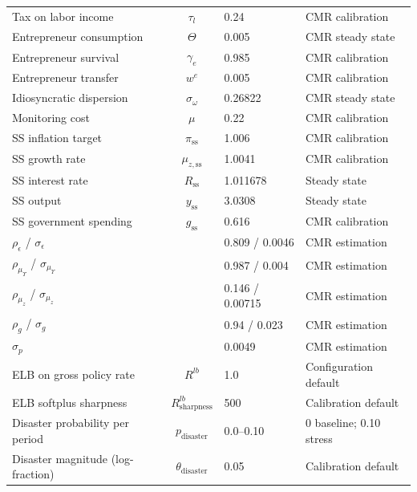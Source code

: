 \documentclass[11pt]{article}
\begin{document}
\begin{table}[h!]
\begin{tabular}{lcll}
Tax on labor income & $\tau_l$ & 0.24 & CMR calibration \\[3pt]
Entrepreneur consumption & $\Theta$ & 0.005 & CMR steady state \\
Entrepreneur survival & $\gamma_e$ & 0.985 & CMR calibration \\
Entrepreneur transfer & $w^e$ & 0.005 & CMR calibration \\
Idiosyncratic dispersion & $\sigma_\omega$ & 0.26822 & CMR steady state \\
Monitoring cost & $\mu$ & 0.22 & CMR calibration \\[3pt]
SS inflation target & $\pi_{\text{ss}}$ & 1.006 & CMR calibration \\
SS growth rate & $\mu_{z,\text{ss}}$ & 1.0041 & CMR calibration \\
SS interest rate & $R_{\text{ss}}$ & 1.011678 & Steady state \\
SS output & $y_{\text{ss}}$ & 3.0308 & Steady state \\
SS government spending & $g_{\text{ss}}$ & 0.616 & CMR calibration \\[3pt]
$\rho_\epsilon$ / $\sigma_\epsilon$ & & 0.809 / 0.0046 & CMR estimation \\
$\rho_{\mu_\Upsilon}$ / $\sigma_{\mu_\Upsilon}$ & & 0.987 / 0.004 & CMR estimation \\
$\rho_{\mu_z}$ / $\sigma_{\mu_z}$ & & 0.146 / 0.00715 & CMR estimation \\
$\rho_g$ / $\sigma_g$ & & 0.94 / 0.023 & CMR estimation \\
$\sigma_p$ & & 0.0049 & CMR estimation \\[3pt]
ELB on gross policy rate & $R^{lb}$ & 1.0 & Configuration default \\
ELB softplus sharpness & $R^{lb}_{\text{sharpness}}$ & 500 & Calibration default \\
Disaster probability per period & $p_{\text{disaster}}$ & 0.0--0.10 & 0 baseline; 0.10 stress \\
Disaster magnitude (log-fraction) & $\theta_{\text{disaster}}$ & 0.05 & Calibration default \\
\bottomrule
\end{tabular}
\end{table}
\end{document}
